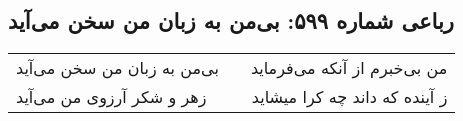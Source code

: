 \begin{center}
\section*{رباعی شماره ۵۹۹: بی‌من به زبان من سخن می‌آید}
\label{sec:0599}
\begin{longtable}{l p{0.5cm} r}
بی‌من به زبان من سخن می‌آید
&&
من بی‌خبرم از آنکه می‌فرماید
\\
زهر و شکر آرزوی من می‌آید
&&
ز آینده که داند چه کرا میشاید
\\
\end{longtable}
\end{center}
